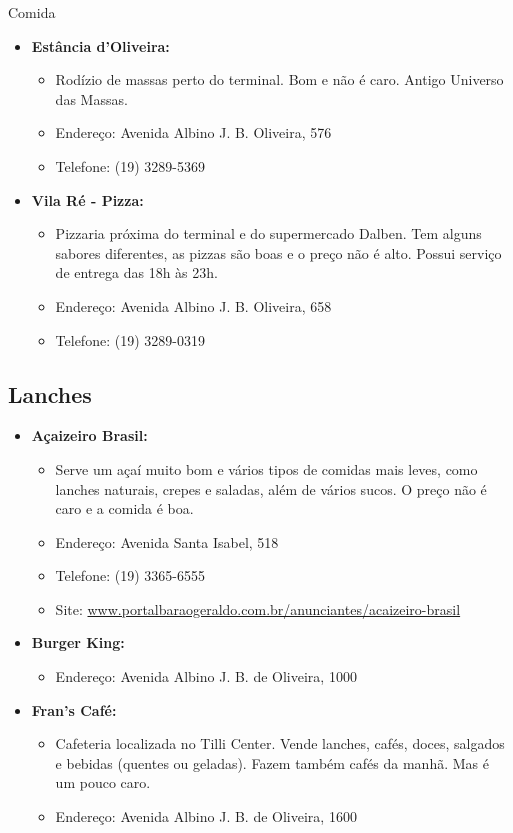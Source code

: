 \begin{story}{Comida}
\begin{itemize}
\item \textbf{Estância d'Oliveira:}
\begin{itemize}
\item Rodízio de massas perto do terminal. Bom e não é caro. Antigo Universo das Massas.
\item Endereço: Avenida Albino J. B. Oliveira, 576
\item Telefone: (19) 3289-5369
\end{itemize}

\item \textbf{Vila Ré - Pizza:}
\begin{itemize}
\item Pizzaria próxima do terminal e do supermercado Dalben. Tem alguns sabores diferentes, as pizzas são boas e o preço não é alto. Possui serviço de entrega das 18h às 23h.
\item Endereço: Avenida Albino J. B. Oliveira, 658
\item Telefone: (19) 3289-0319
\end{itemize}

\end{itemize}

\subsection*{Lanches}

\begin{itemize}

\item \textbf{Açaizeiro Brasil:}
\begin{itemize}
\item Serve um açaí muito bom e vários tipos de comidas mais leves, como lanches naturais, crepes e saladas, além de vários sucos. O preço não é caro e a comida é boa.
\item Endereço: Avenida Santa Isabel, 518
\item Telefone: (19) 3365-6555
\item Site: \url{www.portalbaraogeraldo.com.br/anunciantes/acaizeiro-brasil}
\end{itemize}

\item \textbf{Burger King:}
\begin{itemize}
\item Endereço: Avenida Albino J. B. de Oliveira, 1000
\end{itemize}

\item  \textbf{Fran's Café:}
\begin{itemize}
\item Cafeteria localizada no Tilli Center. Vende lanches, cafés, doces, salgados e bebidas (quentes ou geladas). Fazem também cafés da manhã. Mas é um pouco caro.
\item Endereço: Avenida Albino J. B. de Oliveira, 1600
\end{itemize}


\end{itemize}
\end{story}
